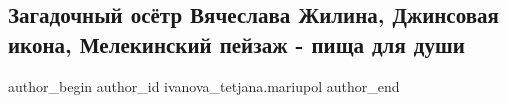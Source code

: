  
 
 
 
 

\subsection{Загадочный осётр Вячеслава Жилина,  Джинсовая икона, Мелекинский пейзаж - пища для души}
\label{sec:21_02_2021.fb.ivanova_tetjana.mariupol.1.zagadochnii_osyotr_v}

\ifcmt
 author_begin
   author_id ivanova_tetjana.mariupol
 author_end
\fi

